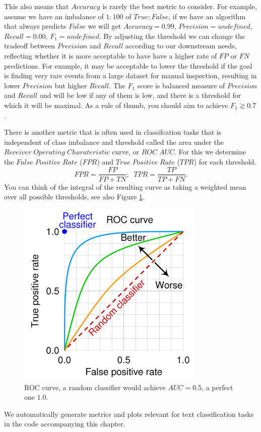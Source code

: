 This also means that $Accuracy$ is rarely the best metric to consider.
For example, assume we have an imbalance of $1 : 100$ of $True : False$, if we have an algorithm that always predicts $False$ we will get $Accuracy = 0.99$, $Precision = undefined$, $Recall = 0.00$, $F_1 = undefined$.
By adjusting the threshold we can change the tradeoff between $Precision$ and $Recall$ according to our downstream needs, reflecting whether it is more acceptable to have have a higher rate of $FP$ or $FN$ predictions.
For example, it may be acceptable to lower the threshold if the goal is finding very rare events from a large dataset for manual inspection, resulting in lower $Precision$ but higher $Recall$.
The $F_1$ score is balanced measure of $Precision$ and $Recall$ and will be low if any of them is low, and there is a threshold for which it will be maximal.
As a rule of thumb, you should aim to achieve $F_1 \gtrsim 0.7$.

There is another metric that is often used in classifcation tasks that is independent of class imbalance and threshold called the area under the $Receiver\; Operating\; Charateristic$ curve, or $ROC\; AUC$.
For this we determine the $False\; Positive\; Rate$ ($FPR$) and $True\; Positive\; Rate$ ($TPR$) for each threshold.
\begin{equation}
    FPR = \frac{FP}{FP + TN}; \;\;
    TPR = \frac{TP}{TP + FN}.
\end{equation}
You can think of the integral of the resulting curve as taking a weighted mean over all possible thresholds, see also Figure \ref{fig:roc_curve}.
\begin{figure}[h]
    \centering
    \includegraphics[width=0.8\textwidth]{chapters/NLP/figures/Roc_curve.svg.png}
    \caption{ROC curve, a random classifier would achieve $AUC = 0.5$, a perfect one $1.0$.}
    \label{fig:roc_curve}
\end{figure}

We automatically generate metrics and plots relevant for text classification tasks in the code accompanying this chapter.

